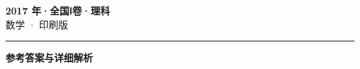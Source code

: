 \documentclass[zihao=5, a4paper]{ctexart}
\begin{document}
\begin{center}
  {\Large\bfseries 2017 年·全国Ⅰ卷·理科}\\[4pt]
  {\large 数学 · 印刷版}
\end{center}
\medskip
{}

\par\bigskip\hrule\bigskip
{}
\begin{center}{\large\bfseries 参考答案与详细解析}\end{center}
\smallskip

\end{document}
